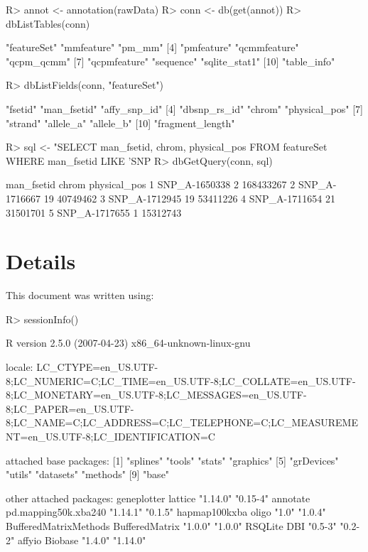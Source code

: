 \documentclass{article}
\begin{document}
\begin{Schunk}
\begin{Sinput}
R> annot <- annotation(rawData)
R> conn <- db(get(annot))
R> dbListTables(conn)
\end{Sinput}
\begin{Soutput}
 [1] "featureSet"   "mmfeature"    "pm_mm"       
 [4] "pmfeature"    "qcmmfeature"  "qcpm_qcmm"   
 [7] "qcpmfeature"  "sequence"     "sqlite_stat1"
[10] "table_info"  
\end{Soutput}
\begin{Sinput}
R> dbListFields(conn, "featureSet")
\end{Sinput}
\begin{Soutput}
 [1] "fsetid"          "man_fsetid"      "affy_snp_id"    
 [4] "dbsnp_rs_id"     "chrom"           "physical_pos"   
 [7] "strand"          "allele_a"        "allele_b"       
[10] "fragment_length"
\end{Soutput}
\begin{Sinput}
R> sql <- "SELECT man_fsetid, chrom, physical_pos FROM featureSet WHERE man_fsetid LIKE 'SNP%
R> dbGetQuery(conn, sql)
\end{Sinput}
\begin{Soutput}
     man_fsetid chrom physical_pos
1 SNP_A-1650338     2    168433267
2 SNP_A-1716667    19     40749462
3 SNP_A-1712945    19     53411226
4 SNP_A-1711654    21     31501701
5 SNP_A-1717655     1     15312743
\end{Soutput}
\end{Schunk}
 
\section{Details}

This document was written using:

\begin{Schunk}
\begin{Sinput}
R> sessionInfo()
\end{Sinput}
\begin{Soutput}
R version 2.5.0 (2007-04-23) 
x86_64-unknown-linux-gnu 

locale:
LC_CTYPE=en_US.UTF-8;LC_NUMERIC=C;LC_TIME=en_US.UTF-8;LC_COLLATE=en_US.UTF-8;LC_MONETARY=en_US.UTF-8;LC_MESSAGES=en_US.UTF-8;LC_PAPER=en_US.UTF-8;LC_NAME=C;LC_ADDRESS=C;LC_TELEPHONE=C;LC_MEASUREMENT=en_US.UTF-8;LC_IDENTIFICATION=C

attached base packages:
[1] "splines"   "tools"     "stats"     "graphics" 
[5] "grDevices" "utils"     "datasets"  "methods"  
[9] "base"     

other attached packages:
          geneplotter               lattice 
             "1.14.0"              "0.15-4" 
             annotate  pd.mapping50k.xba240 
             "1.14.1"               "0.1.5" 
        hapmap100kxba                 oligo 
                "1.0"               "1.0.4" 
BufferedMatrixMethods        BufferedMatrix 
              "1.0.0"               "1.0.0" 
              RSQLite                   DBI 
              "0.5-3"               "0.2-2" 
               affyio               Biobase 
              "1.4.0"              "1.14.0" 
\end{Soutput}
\end{Schunk}
\end{document}
